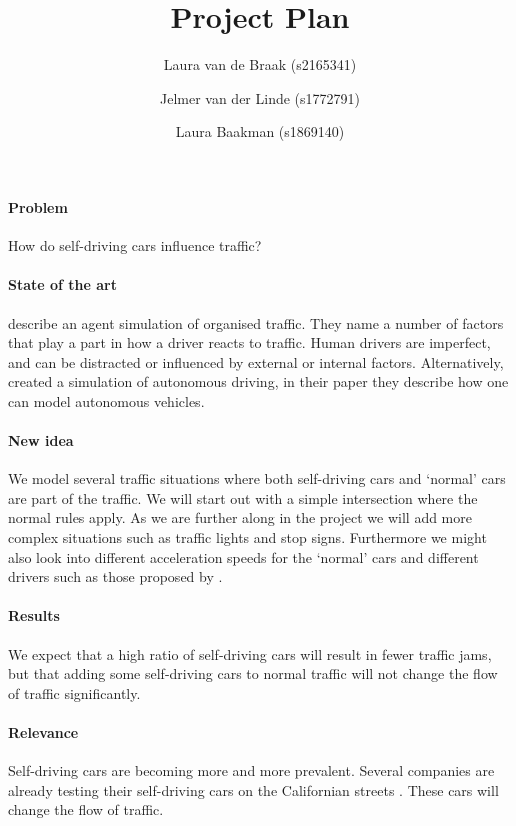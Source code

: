 \documentclass[a4paper]{article}
\title{Project Plan\\ \sc{traffic simulation self-driving cars}}
\author{%
	Laura van de Braak (s2165341) \and 
	Jelmer van der Linde (s1772791) \and 
	Laura Baakman (s1869140)
}
\begin{document}
\maketitle

\paragraph{Problem} How do self-driving cars influence traffic?

\paragraph{State of the art} \citeauthor{paruchuri2002multi} describe an agent simulation of organised traffic. They name a number of factors that play a part in how a driver reacts to traffic. Human drivers are imperfect, and can be distracted or influenced by external or internal factors. Alternatively, \citeauthor{jiang2010microscopic} created a simulation of autonomous driving, in their paper they describe how one can model autonomous vehicles. 

\paragraph{New idea} We model several traffic situations where both self-driving cars and `normal' cars are part of the traffic. We will start out with a simple intersection where the normal rules apply. As we are further along in the project we will add more complex situations such as traffic lights and stop signs. Furthermore we might also look into different acceleration speeds for the `normal' cars and different drivers such as those proposed by \citeauthor{paruchuri2002multi}.

\paragraph{Results} We expect that a high ratio of self-driving cars will result in fewer traffic jams, but that adding some self-driving cars to normal traffic will not change the flow of traffic significantly.  

\paragraph{Relevance} Self-driving cars are becoming more and more prevalent. Several companies are already testing their self-driving cars on the Californian streets \cite{honda}. These cars will change the flow of traffic. 

\printbibliography
\end{document}
